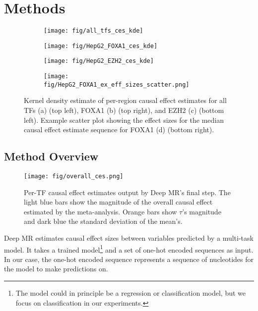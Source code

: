 \documentclass{article}
\begin{document}
\section{Methods}
\begin{figure*}[ht]
\centering
\begin{subfigure}
\centering
\texttt{[image: fig/all\_tfs\_ces\_kde]}
\end{subfigure}%
\vspace{-12pt}
\begin{subfigure}
\centering
\texttt{[image: fig/HepG2\_FOXA1\_ces\_kde]}

\label{fig:sub2}
\end{subfigure}
\begin{subfigure}
\centering
\texttt{[image: fig/HepG2\_EZH2\_ces\_kde]}
\end{subfigure}%
\vspace{-12pt}
\begin{subfigure}
\centering
\texttt{[image: fig/HepG2\_FOXA1\_ex\_eff\_sizes\_scatter.png]}
\end{subfigure}%
\caption{Kernel density estimate of per-region causal effect estimates for all TFs (a) (top left), FOXA1 (b) (top right), and EZH2 (c) (bottom left). Example scatter plot showing the effect sizes for the median causal effect estimate sequence for FOXA1 (d) (bottom right).}
\label{fig:ces_kdes}
\vspace{-9pt}
\end{figure*}
\subsection{Method Overview}
\label{sec:algo_overview}
\begin{figure*}[htpb]
    \centering
    \texttt{[image: fig/overall\_ces.png]}
    \vspace{-12pt}
    \caption{Per-TF causal effect estimates output by Deep MR's final step. The light blue bars show the magnitude of the overall causal effect estimated by the meta-analysis. Orange bars show \( \tau \)'s magnitude and dark blue the standard deviation of the mean's.}
    \vspace{-10pt}
    \label{fig:overall_ces}
\end{figure*}

Deep MR estimates causal effect sizes between variables predicted by a multi-task model. It takes a trained model\footnote{The model could in principle be a regression or classification model, but we focus on classification in our experiments.} and a set of one-hot encoded sequences as input. In our case, the one-hot encoded sequence represents a sequence of nucleotides for the model to make predictions on.
\end{document}
